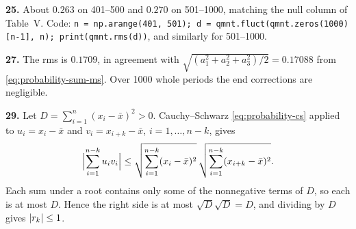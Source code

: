 \textbf{25.} About $0.263$ on 401--500 and $0.270$ on 501--1000, matching the null column of Table~V. Code: \texttt{n = np.arange(401, 501); d = qmnt.fluct(qmnt.zeros(1000)[n-1], n); print(qmnt.rms(d))}, and similarly for 501--1000.

\textbf{27.} The rms is $0.1709$, in agreement with $\sqrt{(a_1^2+a_2^2+a_3^2)/2}=0.17088$ from \cref{eq:probability-sum-ms}. Over 1000 whole periods the end corrections are negligible.

\textbf{29.} Let $D=\sum_{i=1}^n(x_i-\bar x)^2>0$. Cauchy--Schwarz \cref{eq:probability-cs} applied to $u_i=x_i-\bar x$ and $v_i=x_{i+k}-\bar x$, $i=1,\dots,n-k$, gives
\[
\Bigl|\sum_{i=1}^{n-k}u_iv_i\Bigr|\le\sqrt{\sum_{i=1}^{n-k}(x_i-\bar x)^2}\,\sqrt{\sum_{i=1}^{n-k}(x_{i+k}-\bar x)^2}.
\]
Each sum under a root contains only some of the nonnegative terms of $D$, so each is at most $D$. Hence the right side is at most $\sqrt D\sqrt D=D$, and dividing by $D$ gives $\left\lvert r_k\right\rvert\le1$.
